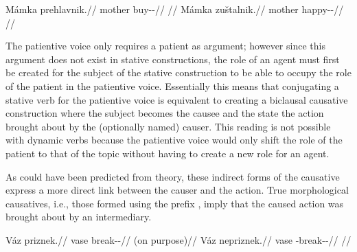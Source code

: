 \pex
\a
\begingl
    \gla \ljudge{*}Mámka prehlavnik.//
    \glb mother buy-\Pv{}-\Pf{}//
    \glft {}//
\endgl
\a
\begingl
    \gla Mámka zuštalnik.//
    \glb mother happy-\Pv{}-\Pf{}//
    \glft {}//
\endgl
\xe

The patientive voice only requires a patient as argument; however since this
argument does not exist in stative constructions, the role of an agent must
first be created for the subject of the stative construction to be able to
occupy the role of the patient in the patientive voice. Essentially this means
that conjugating a stative verb for the patientive voice is equivalent to
creating a biclausal causative construction where the subject becomes the causee
and the state the action brought about by the (optionally named) causer. This
reading is not possible with dynamic verbs because the patientive voice would
only shift the role of the patient to that of the topic without having to create
a new role for an agent.

As could have been predicted from  theory, these indirect
forms of the causative express a more direct link between the causer and the
action. True morphological causatives, i.e., those formed using the prefix
, imply that the caused action was brought about by an intermediary.

\begin{multicols}{2}
\pex
\a
\begingl
\gla Váz priznek.//
\glb vase break-\Pv{}-\Pf{}//
\glft {} (on purpose)//
\endgl
\a
\begingl
\gla Váz nepriznek.//
\glb vase \Caus{}-break-\Pv{}-\Pf{}//
\glft {}//
\endgl
\xe
\end{multicols}

